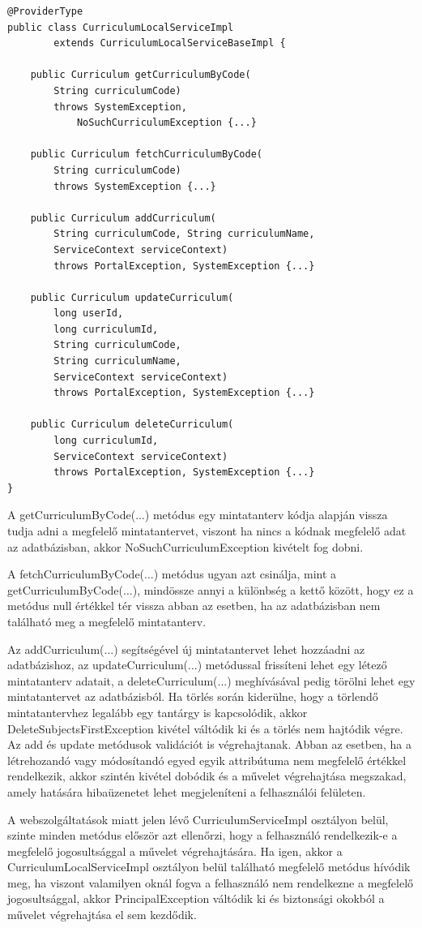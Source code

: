 \documentclass[hidelinks, 12pt, a4paper]{report}
\begin{document}
\begin{lstlisting}[style=customjava]
@ProviderType
public class CurriculumLocalServiceImpl
		extends CurriculumLocalServiceBaseImpl {
	
	public Curriculum getCurriculumByCode(
		String curriculumCode)
		throws SystemException,
			NoSuchCurriculumException {...}

	public Curriculum fetchCurriculumByCode(
		String curriculumCode)
		throws SystemException {...}

	public Curriculum addCurriculum(
		String curriculumCode, String curriculumName,
		ServiceContext serviceContext)
		throws PortalException, SystemException {...}

	public Curriculum updateCurriculum(
		long userId,
		long curriculumId,
		String curriculumCode,
		String curriculumName,
		ServiceContext serviceContext)
		throws PortalException, SystemException {...}

	public Curriculum deleteCurriculum(
		long curriculumId,
		ServiceContext serviceContext)
		throws PortalException, SystemException {...}
}
\end{lstlisting}

A getCurriculumByCode(...) metódus egy mintatanterv kódja alapján vissza tudja adni a megfelelő mintatantervet, viszont ha nincs a kódnak megfelelő adat az adatbázisban, akkor NoSuchCurriculumException kivételt fog dobni.

A fetchCurriculumByCode(...) metódus ugyan azt csinálja, mint a getCurriculumByCode(...), mindössze annyi a különbség a kettő között, hogy ez a metódus null értékkel tér vissza abban az esetben, ha az adatbázisban nem található meg a megfelelő mintatanterv.

Az addCurriculum(...) segítségével új mintatantervet lehet hozzáadni az adatbázishoz, az updateCurriculum(...) metódussal frissíteni lehet egy létező mintatanterv adatait, a deleteCurriculum(...) meghívásával pedig törölni lehet egy mintatantervet az adatbázisból. Ha törlés során kiderülne, hogy a törlendő mintatantervhez legalább egy tantárgy is kapcsolódik, akkor DeleteSubjectsFirstException kivétel váltódik ki és a törlés nem hajtódik végre. Az add és update metódusok validációt is végrehajtanak. Abban az esetben, ha a létrehozandó vagy módosítandó egyed egyik attribútuma nem megfelelő értékkel rendelkezik, akkor szintén kivétel dobódik és a művelet végrehajtása megszakad, amely hatására hibaüzenetet lehet megjeleníteni a felhasználói felületen.

A webszolgáltatások miatt jelen lévő CurriculumServiceImpl osztályon belül, szinte minden metódus először azt ellenőrzi, hogy a felhasználó rendelkezik-e a megfelelő jogosultsággal a művelet végrehajtására. Ha igen, akkor a CurriculumLocalServiceImpl osztályon belül található megfelelő metódus hívódik meg, ha viszont valamilyen oknál fogva a felhasználó nem rendelkezne a megfelelő jogosultsággal, akkor PrincipalException váltódik ki és biztonsági okokból a művelet végrehajtása el sem kezdődik.
\end{document}
